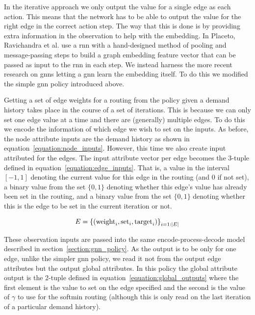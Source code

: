 In the iterative approach we only output the value for a single edge as each action. This means that the network has to be able to output the value for the right edge in the correct action step. The way that this is done is by providing extra information in the observation to help with the embedding. In Placeto, Ravichandra et al. use a \acf{rnn} with a hand-designed method of pooling and message-passing steps to build a graph embedding feature vector that can be passed as input to the \ac{rnn} in each step. We instead harness the more recent research on \acp{gnn} letting a \ac{gnn} learn the embedding itself. To do this we modified the simple \ac{gnn} policy introduced above.

Getting a set of edge weights for a routing from the policy given a demand history takes place in the course of a set of iterations. This is because we can only set one edge value at a time and there are (generally) multiple edges. To do this we encode the information of which edge we wish to set on the inputs. As before, the node attribute inputs are the demand history as shown in equation~\ref{equation:node_inputs}. However, this time we also create input attributed for the edges. The input attribute vector per edge becomes the 3-tuple defined in equation~\ref{equation:edge_inputs}. That is, a value in the interval $[-1,1]$ denoting the current value for this edge in the routing (and 0 if not set), a binary value from the set $\{0,1\}$ denoting whether this edge's value has already been set in the routing, and a binary value from the set $\{0,1\}$ denoting whether this is the edge to be set in the current iteration or not.

\begin{equation}
  \label{equation:edge_inputs}
  E = \left\{ (\operatorname{weight}_i, \operatorname{set\vphantom{_i}}_i, \operatorname{target}_i) \right\}_{i=1:|E|}
\end{equation}

These observation inputs are passed into the same encode-process-decode model described in section~\ref{section:gnn_policy}. As the output is to be only for one edge, unlike the simpler \ac{gnn} policy, we read it not from the output edge attributes but the output global attributes. In this policy the global attribute output is the 2-tuple defined in equation~\ref{equation:global_outputs} where the first element is the value to set on the edge specified and the second is the value of $\gamma$ to use for the softmin routing (although this is only read on the last iteration of a particular demand history).

